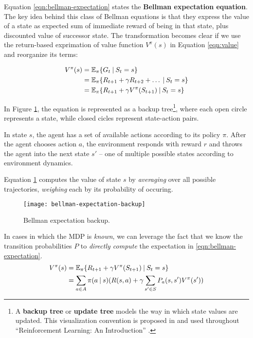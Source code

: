 Equation \ref{eqn:bellman-expectation} states the \textbf{Bellman expectation equation}.
The key idea behind this class of Bellman equations is that they express the value of a state as expected sum of immediate reward of being in that state,  plus discounted value of successor state.
The transformation becomes clear if we use the return-based exprimation of value function $V^{\pi}(s)$ in Equation \ref{eqn:value} and reorganize its terms:

\begin{equation} \label{eqn:bellman-expectation}
\begin{aligned}
    V^{\pi}(s)
        &= \mathbb{E}_{\pi}\{ G_t \:\vert\: S_t = s \} \\
        &= \mathbb{E}_{\pi}\{ R_{t+1} + \gamma R_{t+2} + \dots \:\vert\: S_t = s \} \\
        &= \mathbb{E}_{\pi}\{ R_{t+1} + \gamma V^{\pi}(S_{t+1}) \:\vert\: S_{t} = s \} \\
\end{aligned}
\end{equation}

In Figure \ref{fig:expectation-backup}, the equation is represented as a backup tree\footnote{A \textbf{backup tree} or \textbf{update tree} models the way in which state values are updated. This visualization convention is proposed in and used throughout ``Reinforcement Learning: An Introduction'' \cite{rlai}.}, where each open circle represents a state, while closed cicles represent state-action pairs.

In state $s$, the agent has a set of available actions according to its policy $\pi$.
After the agent chooses action $a$, the environment responds with reward $r$ and throws the agent into the next state  $s'$ -- one of multiple possible states according to environment dynamics.

Equation \ref{fig:expectation-backup} computes the value of state $s$ by \emph{averaging} over all possible trajectories, \emph{weighing} each by its probability of occuring.

\begin{figure}[ht]
    \centering
    \caption{Bellman expectation backup.} \label{fig:expectation-backup}
    \vspace*{0.2cm}
    \texttt{[image: bellman-expectation-backup]}
\end{figure}

In cases in which the MDP is \emph{known}, we can leverage the fact that we know the transition probabilities $P$ to \emph{directly compute} the expectation in \ref{eqn:bellman-expectation}.
\begin{equation}
    \begin{aligned}
        V^{\pi}(s)
            &= \mathbb{E}_{\pi}\{ R_{t+1} + \gamma V^{\pi}(S_{t+1}) \:\vert\: S_{t} = s \} \\
            &= \sum_{a \in A}{
                \pi(a \:\vert\: s) ( R(s, a) + \gamma \sum_{s' \in S}{
                    P_a(s, s') V^{\pi}(s')
                })
            }
    \end{aligned}
\end{equation}

